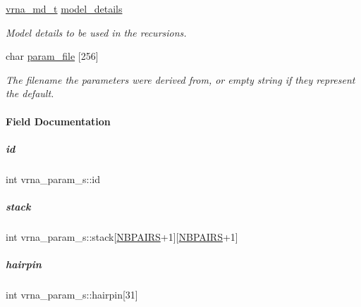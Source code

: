 \begin{DoxyCompactItemize}
\mbox{\hyperlink{group__model__details_ga1f8a10e12a0a1915f2a4eff0b28ea17c}{vrna\+\_\+md\+\_\+t}} \mbox{\hyperlink{group__energy__parameters_a7b84353eb9075c595bad4ceb871bcae7}{model\+\_\+details}}
\begin{DoxyCompactList}\small\item\em Model details to be used in the recursions. \end{DoxyCompactList}\item 
char \mbox{\hyperlink{group__energy__parameters_ace10aa4aacffcbf6de92349f2ee0d66a}{param\+\_\+file}} \mbox{[}256\mbox{]}
\begin{DoxyCompactList}\small\item\em The filename the parameters were derived from, or empty string if they represent the default. \end{DoxyCompactList}\end{DoxyCompactItemize}


\paragraph{Field Documentation}
\mbox{\label{group__energy__parameters_ab2e674fea69570fb83bcf63f19e433ee}} 
\subparagraph{\texorpdfstring{id}{id}}
{\footnotesize\ttfamily int vrna\+\_\+param\+\_\+s\+::id}

\mbox{\label{group__energy__parameters_af7cdedcea1bb1c171856ab06dc9f6ed2}} 
\subparagraph{\texorpdfstring{stack}{stack}}
{\footnotesize\ttfamily int vrna\+\_\+param\+\_\+s\+::stack\mbox{[}\mbox{\hyperlink{energy__const_8h_a5e75221c779d618eab81e096f37e32ce}{N\+B\+P\+A\+I\+RS}}+1\mbox{]}\mbox{[}\mbox{\hyperlink{energy__const_8h_a5e75221c779d618eab81e096f37e32ce}{N\+B\+P\+A\+I\+RS}}+1\mbox{]}}

\mbox{\label{group__energy__parameters_ac3160bdbb97b2ef9e949c9ba66bf057c}} 
\subparagraph{\texorpdfstring{hairpin}{hairpin}}
{\footnotesize\ttfamily int vrna\+\_\+param\+\_\+s\+::hairpin\mbox{[}31\mbox{]}}

